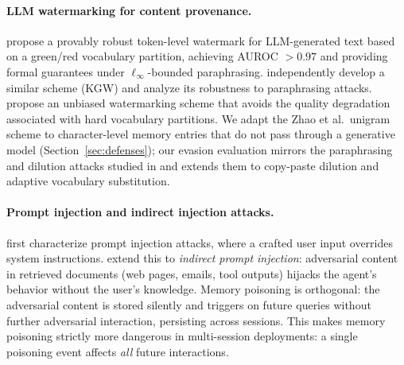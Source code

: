 \paragraph{LLM watermarking for content provenance.}
\citet{zhao2024watermark} propose a provably robust token-level watermark
for LLM-generated text based on a green/red vocabulary partition, achieving
AUROC $> 0.97$ and providing formal guarantees under $\ell_\infty$-bounded
paraphrasing.  \citet{kirchenbauer2023watermark} independently develop
a similar scheme (KGW) and analyze its robustness to paraphrasing attacks.
\citet{hu2023unbiased} propose an unbiased watermarking scheme that avoids
the quality degradation associated with hard vocabulary partitions.
We adapt the Zhao et al.\ unigram scheme to character-level memory entries
that do not pass through a generative model (Section~\ref{sec:defenses});
our evasion evaluation mirrors the paraphrasing and dilution attacks studied
in \citet{kirchenbauer2023watermark} and extends them to copy-paste dilution
and adaptive vocabulary substitution.

\paragraph{Prompt injection and indirect injection attacks.}
\citet{perez2022ignore} first characterize prompt injection attacks, where
a crafted user input overrides system instructions.  \citet{greshake2023not}
extend this to \emph{indirect prompt injection}: adversarial content in
retrieved documents (web pages, emails, tool outputs) hijacks the agent's
behavior without the user's knowledge.  Memory poisoning is orthogonal:
the adversarial content is stored silently and triggers on future queries
without further adversarial interaction, persisting across sessions.
This makes memory poisoning strictly more dangerous in multi-session
deployments: a single poisoning event affects \emph{all} future interactions.

